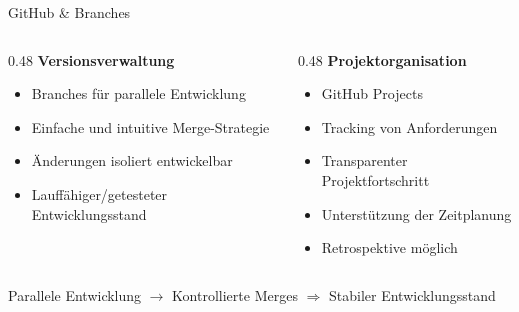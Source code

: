 \documentclass[aspectratio=169]{beamer}
\begin{document}
\begin{frame}{GitHub \& Branches}

\begin{columns}[T]

\begin{column}{0.48\textwidth}
\textbf{Versionsverwaltung}

\begin{itemize}
    \item Branches für parallele Entwicklung
    \item Einfache und intuitive Merge-Strategie
    \item Änderungen isoliert entwickelbar
    \item Lauffähiger/getesteter Entwicklungsstand
\end{itemize}

\end{column}

\begin{column}{0.48\textwidth}
\textbf{Projektorganisation}

\begin{itemize}
    \item GitHub Projects
    \item Tracking von Anforderungen
    \item Transparenter Projektfortschritt
    \item Unterstützung der Zeitplanung
    \item Retrospektive möglich
\end{itemize}

\end{column}

\end{columns}

\vfill

\begin{center}
\Large
Parallele Entwicklung $\rightarrow$ Kontrollierte Merges $\Rightarrow$ Stabiler Entwicklungsstand
\end{center}

\end{frame}
\end{document}
